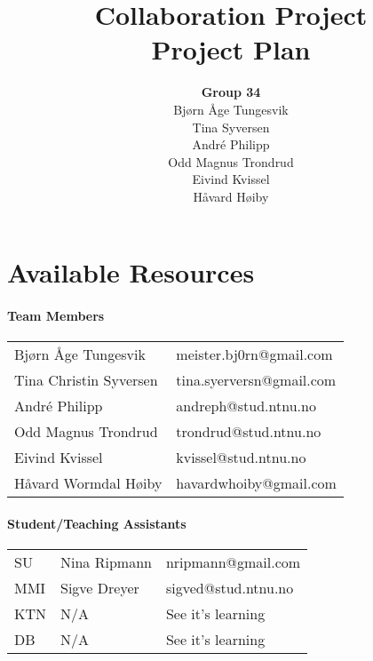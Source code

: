 \documentclass{article}
\begin{document}

\begin{titlepage}
\title{Collaboration Project\\
\textbf{Project Plan}}
\author{\textbf{Group 34}\\
Bj\o rn \AA ge Tungesvik\\
Tina Syversen\\
Andr\'e Philipp\\
Odd Magnus Trondrud
\\Eivind Kvissel\\
H\aa vard H\o iby}
\maketitle
\end{titlepage}%

\newpage

\part{Available Resources}

\subsection{Team Members}

\begin{tabular}{ll}
Bj\o rn \AA ge Tungesvik & meister.bj0rn@gmail.com \\ 
Tina Christin Syversen & tina.syerversn@gmail.com \\ 
Andr\'{e} Philipp & andreph@stud.ntnu.no \\ 
Odd Magnus Trondrud & trondrud@stud.ntnu.no \\ 
Eivind Kvissel & kvissel@stud.ntnu.no \\ 
H\aa vard Wormdal H\o iby & havardwhoiby@gmail.com%
\end{tabular}

\subsection{Student/Teaching Assistants}

\begin{tabular}{lll}
SU & Nina Ripmann & nripmann@gmail.com \\ 
MMI & Sigve Dreyer & sigved@stud.ntnu.no \\ 
KTN & N/A & See it's learning \\ 
DB & N/A & See it's learning%
\end{tabular}
\end{document}
